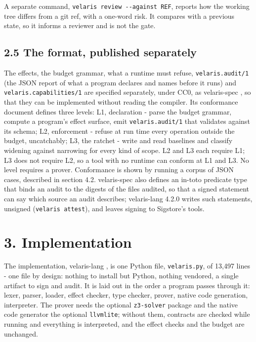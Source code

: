 \documentclass[
]{article}
\begin{document}
A separate command, \texttt{velaris\ review\ -\/-against\ REF}, reports
how the working tree differs from a git ref, with a one-word risk. It
compares with a previous state, so it informs a reviewer and is not the
gate.

\subsection{2.5 The format, published
separately}\label{the-format-published-separately}

The effects, the budget grammar, what a runtime must refuse,
\texttt{velaris.audit/1} (the JSON report of what a program declares and
names before it runs) and \texttt{velaris.capabilities/1} are specified
separately, under CC0, as velaris-spec \citep{velaris_spec}, so that
they can be implemented without reading the compiler. Its conformance
document defines three levels: L1, declaration - parse the budget
grammar, compute a program's effect surface, emit
\texttt{velaris.audit/1} that validates against its schema; L2,
enforcement - refuse at run time every operation outside the budget,
uncatchably; L3, the ratchet - write and read baselines and classify
widening against narrowing for every kind of scope. L2 and L3 each
require L1; L3 does not require L2, so a tool with no runtime can
conform at L1 and L3. No level requires a prover. Conformance is shown
by running a corpus of JSON cases, described in section 4.2.
velaris-spec also defines an in-toto predicate type that binds an audit
to the digests of the files audited, so that a signed statement can say
which source an audit describes; velaris-lang 4.2.0 writes such
statements, unsigned (\texttt{velaris\ attest}), and leaves signing to
Sigstore's tools.

\section{3. Implementation}\label{implementation}

The implementation, velaris-lang \citep{velaris_lang}, is one Python
file, \texttt{velaris.py}, of 13,497 lines - one file by design: nothing
to install but Python, nothing vendored, a single artifact to sign and
audit. It is laid out in the order a program passes through it: lexer,
parser, loader, effect checker, type checker, prover, native code
generation, interpreter. The prover needs the optional
\texttt{z3-solver} package and the native code generator the optional
\texttt{llvmlite}; without them, contracts are checked while running and
everything is interpreted, and the effect checks and the budget are
unchanged.
\end{document}
